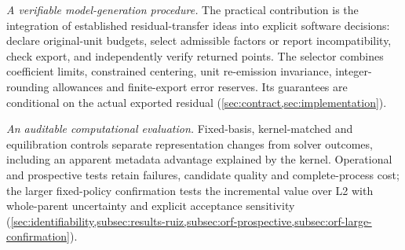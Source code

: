 \item \emph{A verifiable model-generation procedure.} The practical contribution
is the integration of established residual-transfer ideas into explicit software
decisions: declare original-unit budgets, select admissible factors or report
incompatibility, check export, and independently verify returned points. The
selector combines coefficient limits, constrained centering, unit re-emission
invariance, integer-rounding allowances and finite-export error reserves.
Its guarantees are conditional on the actual exported residual
(\cref{sec:contract,sec:implementation}).
\item \emph{An auditable computational evaluation.} Fixed-basis, kernel-matched
and equilibration controls separate representation changes from solver outcomes,
including an apparent metadata advantage explained by the kernel. Operational
and prospective tests retain failures, candidate quality and complete-process
cost; the larger fixed-policy confirmation tests the incremental value over L2
with whole-parent uncertainty and explicit acceptance sensitivity
(\cref{sec:identifiability,subsec:results-ruiz,subsec:orf-prospective,subsec:orf-large-confirmation}).
